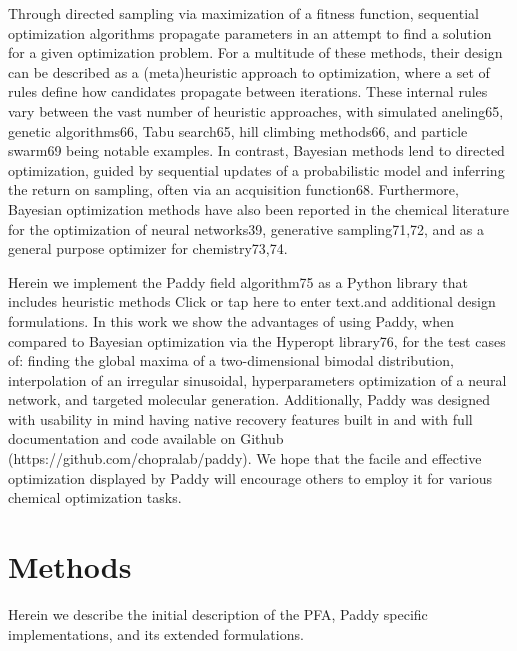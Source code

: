 Through directed sampling via maximization of a fitness function, sequential optimization algorithms propagate parameters in an attempt to find a solution for a given optimization problem.  For a multitude of these methods, their design can be described as a (meta)heuristic approach to optimization, where a set of rules define how candidates propagate between iterations.  These internal rules vary between the vast number of heuristic approaches, with simulated aneling65, genetic algorithms66, Tabu search65, hill climbing methods66, and particle swarm69 being notable examples.  In contrast, Bayesian methods lend to directed optimization, guided by sequential updates of a probabilistic model and inferring the return on sampling, often via an acquisition function68.  Furthermore, Bayesian optimization methods have also been reported in the chemical literature for the optimization of neural networks39, generative sampling71,72, and as a general purpose optimizer for chemistry73,74.  

Herein we implement the Paddy field algorithm75 as a Python library that includes heuristic methods Click or tap here to enter text.and additional design formulations.  In this work we show the advantages of using Paddy, when compared to Bayesian optimization via the Hyperopt library76, for the test cases of: finding the global maxima of a two-dimensional bimodal distribution, interpolation of an irregular sinusoidal, hyperparameters optimization of a neural network, and targeted molecular generation.  Additionally, Paddy was designed with usability in mind having native recovery features built in and with full documentation and code available on Github (https://github.com/chopralab/paddy).  We hope that the facile and effective optimization displayed by Paddy will encourage others to employ it for various chemical optimization tasks.

\section{Methods}
Herein we describe the initial description of the PFA, Paddy specific implementations, and its extended formulations. 

